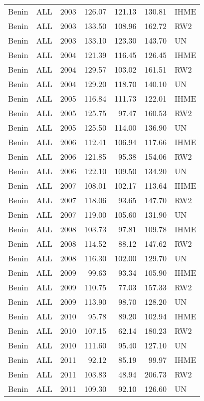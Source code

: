 \begin{longtable}{lllrrrl}
  Benin & ALL & 2003 & 126.07 & 121.13 & 130.81 & IHME \\ 
  Benin & ALL & 2003 & 133.50 & 108.96 & 162.72 & RW2 \\ 
  Benin & ALL & 2003 & 133.10 & 123.30 & 143.70 & UN \\ 
  Benin & ALL & 2004 & 121.39 & 116.45 & 126.45 & IHME \\ 
  Benin & ALL & 2004 & 129.57 & 103.02 & 161.51 & RW2 \\ 
  Benin & ALL & 2004 & 129.20 & 118.70 & 140.10 & UN \\ 
  Benin & ALL & 2005 & 116.84 & 111.73 & 122.01 & IHME \\ 
  Benin & ALL & 2005 & 125.75 & 97.47 & 160.53 & RW2 \\ 
  Benin & ALL & 2005 & 125.50 & 114.00 & 136.90 & UN \\ 
  Benin & ALL & 2006 & 112.41 & 106.94 & 117.66 & IHME \\ 
  Benin & ALL & 2006 & 121.85 & 95.38 & 154.06 & RW2 \\ 
  Benin & ALL & 2006 & 122.10 & 109.50 & 134.20 & UN \\ 
  Benin & ALL & 2007 & 108.01 & 102.17 & 113.64 & IHME \\ 
  Benin & ALL & 2007 & 118.06 & 93.65 & 147.70 & RW2 \\ 
  Benin & ALL & 2007 & 119.00 & 105.60 & 131.90 & UN \\ 
  Benin & ALL & 2008 & 103.73 & 97.81 & 109.78 & IHME \\ 
  Benin & ALL & 2008 & 114.52 & 88.12 & 147.62 & RW2 \\ 
  Benin & ALL & 2008 & 116.30 & 102.00 & 129.70 & UN \\ 
  Benin & ALL & 2009 & 99.63 & 93.34 & 105.90 & IHME \\ 
  Benin & ALL & 2009 & 110.75 & 77.03 & 157.33 & RW2 \\ 
  Benin & ALL & 2009 & 113.90 & 98.70 & 128.20 & UN \\ 
  Benin & ALL & 2010 & 95.78 & 89.20 & 102.94 & IHME \\ 
  Benin & ALL & 2010 & 107.15 & 62.14 & 180.23 & RW2 \\ 
  Benin & ALL & 2010 & 111.60 & 95.40 & 127.10 & UN \\ 
  Benin & ALL & 2011 & 92.12 & 85.19 & 99.97 & IHME \\ 
  Benin & ALL & 2011 & 103.83 & 48.94 & 206.73 & RW2 \\ 
  Benin & ALL & 2011 & 109.30 & 92.10 & 126.60 & UN \\ 

\end{longtable}
